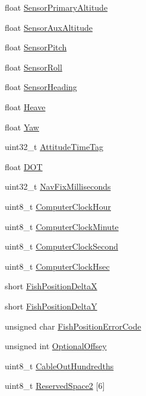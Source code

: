\begin{DoxyCompactItemize}
\item 
float \hyperlink{structXtfPingHeader_a9b6bd368e97d2d3e00ce5bba7abf30d0}{Sensor\+Primary\+Altitude}
\item 
float \hyperlink{structXtfPingHeader_a3c60c1f42c53e3533c08a93a3fee027b}{Sensor\+Aux\+Altitude}
\item 
float \hyperlink{structXtfPingHeader_aa3dbc632d9429a3638b3ebffeb8f2e64}{Sensor\+Pitch}
\item 
float \hyperlink{structXtfPingHeader_a0aa89112bcb5a598ea575adb63e392c5}{Sensor\+Roll}
\item 
float \hyperlink{structXtfPingHeader_af8dc29cd8b8989d596433139b3fd66a1}{Sensor\+Heading}
\item 
float \hyperlink{structXtfPingHeader_a82e649a277ebefc678002f2f35a9ed1a}{Heave}
\item 
float \hyperlink{structXtfPingHeader_a705d9bcf0415f5c2138b83e0d865b528}{Yaw}
\item 
uint32\+\_\+t \hyperlink{structXtfPingHeader_ad60f19c7449cfb2569dddcbb93da7042}{Attitude\+Time\+Tag}
\item 
float \hyperlink{structXtfPingHeader_a48229392bb4ccc8bdc35e8f2a19cc363}{D\+OT}
\item 
uint32\+\_\+t \hyperlink{structXtfPingHeader_a5475582e52b52f56416b5a4ee93b5e92}{Nav\+Fix\+Milliseconds}
\item 
uint8\+\_\+t \hyperlink{structXtfPingHeader_ac7e8ed5281deee113f91b7339e0babbd}{Computer\+Clock\+Hour}
\item 
uint8\+\_\+t \hyperlink{structXtfPingHeader_a4ffa1e429080763b4e405cdc389af671}{Computer\+Clock\+Minute}
\item 
uint8\+\_\+t \hyperlink{structXtfPingHeader_a3953292e24a019093dfa8a423b803268}{Computer\+Clock\+Second}
\item 
uint8\+\_\+t \hyperlink{structXtfPingHeader_a5f864caca5f651aaf4377c2609d9dab7}{Computer\+Clock\+Hsec}
\item 
short \hyperlink{structXtfPingHeader_a84994ace0bc0e1c776355d7739b9f93d}{Fish\+Position\+DeltaX}
\item 
short \hyperlink{structXtfPingHeader_a100011d222312bc4177490e6b36f9de4}{Fish\+Position\+DeltaY}
\item 
unsigned char \hyperlink{structXtfPingHeader_a7990fd8fa82298bc812014a14cad74ff}{Fish\+Position\+Error\+Code}
\item 
unsigned int \hyperlink{structXtfPingHeader_a5a03b90aab99da9f6b2ff3cb384fd859}{Optional\+Offsey}
\item 
uint8\+\_\+t \hyperlink{structXtfPingHeader_a29adedb19cbbd3f9096038bc8e8c7bb4}{Cable\+Out\+Hundredths}
\item 
uint8\+\_\+t \hyperlink{structXtfPingHeader_ab2405648890a0cc720da8bf0adbecd0f}{Reserved\+Space2} \mbox{[}6\mbox{]}
\end{DoxyCompactItemize}


